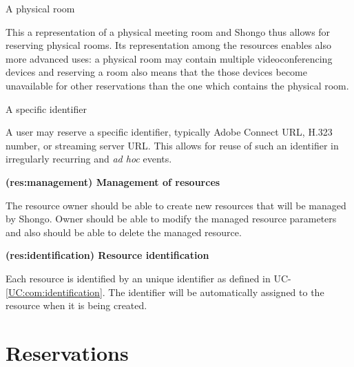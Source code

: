 \documentclass[a4paper]{report}
\makeatletter
\newcounter{UCcounter}
\newenvironment{UseCases}%
	{\begin{list}{\textbf{UC-\arabic{UCcounter}}}{\@nmbrlisttrue\def\@listctr{UCcounter}}}%
	{\end{list}}
\newcommand{\UClabel}[1]{\label{UC:#1}}
\newcommand{\UCref}[1]{UC-\ref{UC:#1}}
\newcommand{\UseCase}[2]{\item\UClabel{#2} \textbf{(#2) #1}\\ \nopagebreak}
\makeatother
\begin{document}
\begin{UseCases}
\begin{compactdesc}
\item[A physical room]

This a representation of a physical meeting room and Shongo thus allows for
reserving physical rooms. Its representation among the resources enables also
more advanced uses: a physical room may contain multiple videoconferencing
devices and reserving a room also means that the those devices become
unavailable for other reservations than the one which contains the physical
room.

\item[A specific identifier]

A user may reserve a specific identifier, typically Adobe Connect URL, H.323
number, or streaming server URL. This allows for reuse of such an identifier in
irregularly recurring and \emph{ad hoc} events.

\end{compactdesc}


\UseCase{Management of resources}{res:management}

The resource owner should be able to create new resources that will be managed by Shongo. Owner should be able to modify the managed resource parameters and also should be able to delete the managed resource.

\UseCase{Resource identification}{res:identification}

Each resource is identified by an unique identifier as defined in \UCref{com:identification}. The identifier will be
automatically assigned to the resource when it is being created.

\end{UseCases}


\section{Reservations}
\end{document}
